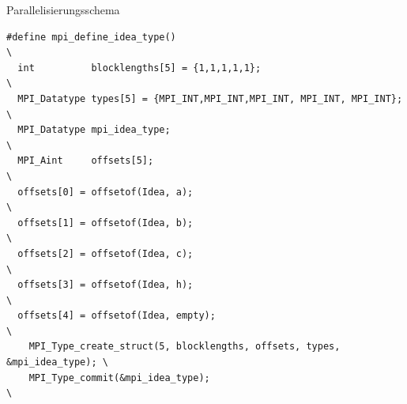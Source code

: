 \begin{frame} {Parallelisierungsschema}
  \begin{verbatim}
#define mpi_define_idea_type()                                               \
  int          blocklengths[5] = {1,1,1,1,1};                                  \
  MPI_Datatype types[5] = {MPI_INT,MPI_INT,MPI_INT, MPI_INT, MPI_INT};               \
  MPI_Datatype mpi_idea_type;                                                \
  MPI_Aint     offsets[5];                                                   \
  offsets[0] = offsetof(Idea, a);                                            \
  offsets[1] = offsetof(Idea, b);                                            \
  offsets[2] = offsetof(Idea, c);                                            \
  offsets[3] = offsetof(Idea, h);                                            \
  offsets[4] = offsetof(Idea, empty);                                        \
    MPI_Type_create_struct(5, blocklengths, offsets, types, &mpi_idea_type); \
    MPI_Type_commit(&mpi_idea_type);                                         \
\end{verbatim}
\end{frame}
